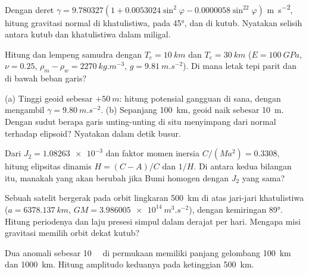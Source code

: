 \begin{exercise}[$\star$]\label{exo:b3:gravity-geodesy:3}
Dengan deret $\gamma = 9.780327(1 + 0.0053024\sin^2\varphi -
0.0000058\sin^22\varphi)$ \unit{m.s^{-2}}, hitung gravitasi normal di
khatulistiwa, pada \ang{45}, dan di kutub. Nyatakan selisih antara kutub
dan khatulistiwa dalam miligal.
\end{exercise}

\begin{exercise}[$\star$]\label{exo:b3:gravity-geodesy:4}
Hitung  dan  lempeng samudra dengan
$T_e = \qty{10}{km}$ dan $T_e = \qty{30}{km}$ ($E = \qty{100}{GPa}$,
$\nu = 0.25$, $\rho_m - \rho_w = \qty{2270}{kg.m^{-3}}$, $g =
\qty{9.81}{m.s^{-2}}$). Di mana letak tepi parit dan  di bawah
beban garis?
\end{exercise}

\begin{exercise}[$\star\star$]\label{exo:b3:gravity-geodesy:5}
(a) Tinggi geoid sebesar $+\qty{50}{m}$: hitung potensial gangguan di sana,
dengan mengambil $\gamma = \qty{9.80}{m.s^{-2}}$. (b) Sepanjang \qty{100}{km}, geoid naik
sebesar \qty{10}{m}. Dengan sudut berapa garis unting-unting di situ menyimpang dari normal
terhadap elipsoid? Nyatakan dalam detik busur.
\end{exercise}

\begin{exercise}[$\star\star$]\label{exo:b3:gravity-geodesy:6}
Dari $J_2 = \num{1.08263e-3}$ dan faktor momen inersia
$C/(Ma^2) = \num{0.3308}$, hitung elipsitas dinamis $H = (C - A)/C$ dan
$1/H$. Di antara kedua bilangan itu, manakah yang akan berubah jika Bumi homogen dengan $J_2$ yang sama?
\end{exercise}

\begin{exercise}[$\star\star$]\label{exo:b3:gravity-geodesy:7}
Sebuah satelit bergerak pada orbit lingkaran \qty{500}{km} di atas jari-jari khatulistiwa
($a = \qty{6378.137}{km}$, $GM = \qty{3.986005e14}{m^3.s^{-2}}$), dengan kemiringan
\ang{89}. Hitung periodenya dan laju presesi simpul dalam derajat per hari.
Mengapa misi gravitasi memilih orbit dekat kutub?
\end{exercise}

\begin{exercise}[$\star\star$]\label{exo:b3:gravity-geodesy:8}
Dua anomali sebesar \qty{10}{\milli\gal} di permukaan memiliki panjang gelombang
\qty{100}{km} dan \qty{1000}{km}. Hitung amplitudo keduanya pada
ketinggian \qty{500}{km}.
\end{exercise}

